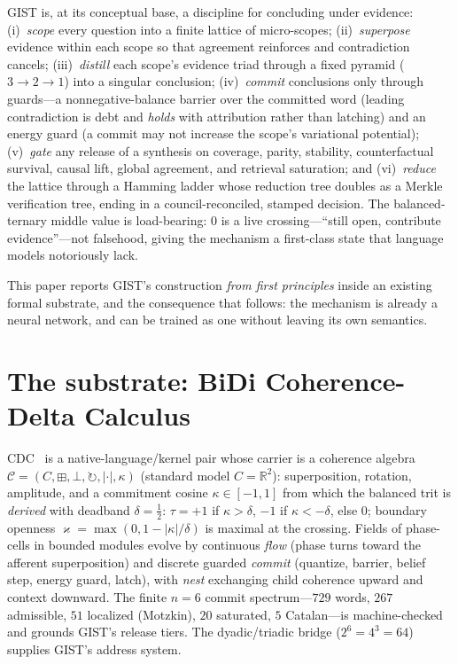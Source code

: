 \documentclass[11pt]{article}
\begin{document}
GIST is, at its conceptual base, a discipline for concluding under
evidence: (i)~\emph{scope} every question into a finite lattice of
micro-scopes; (ii)~\emph{superpose} evidence within each scope so that
agreement reinforces and contradiction cancels; (iii)~\emph{distill}
each scope's evidence triad through a fixed pyramid ($3{\to}2{\to}1$)
into a singular conclusion; (iv)~\emph{commit} conclusions only through
guards---a nonnegative-balance barrier over the committed word (leading
contradiction is debt and \emph{holds} with attribution rather than
latching) and an energy guard (a commit may not increase the scope's
variational potential); (v)~\emph{gate} any release of a synthesis on
coverage, parity, stability, counterfactual survival, causal lift,
global agreement, and retrieval saturation; and (vi)~\emph{reduce}
the lattice through a Hamming ladder whose reduction tree doubles as a
Merkle verification tree, ending in a council-reconciled, stamped
decision. The balanced-ternary middle value is load-bearing: $0$ is a
live crossing---``still open, contribute evidence''---not falsehood,
giving the mechanism a first-class state that language models
notoriously lack.

This paper reports GIST's construction \emph{from first principles}
inside an existing formal substrate, and the consequence that follows:
the mechanism is already a neural network, and can be trained as one
without leaving its own semantics.

\section{The substrate: BiDi Coherence-Delta Calculus}

CDC~\cite{bidi} is a native-language/kernel pair whose carrier is a
coherence algebra $\mathcal{C}=(C,\boxplus,\bot,\circlearrowright,
|{\cdot}|,\kappa)$ (standard model $C=\mathbb{R}^2$): superposition,
rotation, amplitude, and a commitment cosine $\kappa\in[-1,1]$ from which
the balanced trit is \emph{derived} with deadband $\delta=\tfrac12$:
$\tau=+1$ if $\kappa>\delta$, $-1$ if $\kappa<-\delta$, else $0$; boundary
openness $\varkappa=\max(0,1-|\kappa|/\delta)$ is maximal at the crossing.
Fields of phase-cells in bounded modules evolve by continuous \emph{flow}
(phase turns toward the afferent superposition) and discrete guarded
\emph{commit} (quantize, barrier, belief step, energy guard, latch), with
\emph{nest} exchanging child coherence upward and context downward. The
finite $n{=}6$ commit spectrum---$729$ words, $267$ admissible, $51$
localized (Motzkin), $20$ saturated, $5$ Catalan---is machine-checked and
grounds GIST's release tiers. The dyadic/triadic bridge
($2^6{=}4^3{=}64$) supplies GIST's address system.
\end{document}
